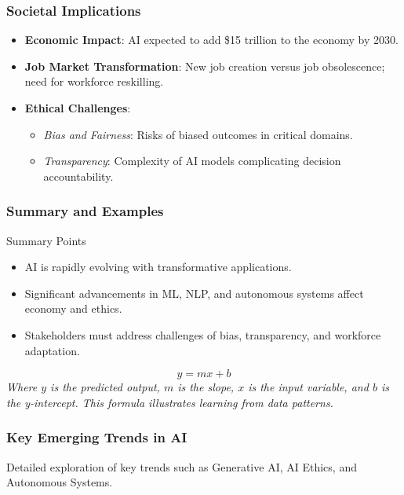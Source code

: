 \documentclass[aspectratio=169]{beamer}
\begin{document}
\begin{frame}[fragile]
    \frametitle{Societal Implications}
    \begin{itemize}
        \item \textbf{Economic Impact}: AI expected to add \$15 trillion to the economy by 2030.
        \item \textbf{Job Market Transformation}: New job creation versus job obsolescence; need for workforce reskilling.
        \item \textbf{Ethical Challenges}:
            \begin{itemize}
                \item \textit{Bias and Fairness}: Risks of biased outcomes in critical domains.
                \item \textit{Transparency}: Complexity of AI models complicating decision accountability.
            \end{itemize}
    \end{itemize}
\end{frame}

\begin{frame}[fragile]
    \frametitle{Summary and Examples}
    \begin{block}{Summary Points}
        \begin{itemize}
            \item AI is rapidly evolving with transformative applications.
            \item Significant advancements in ML, NLP, and autonomous systems affect economy and ethics.
            \item Stakeholders must address challenges of bias, transparency, and workforce adaptation.
        \end{itemize}
    \end{block}
    
    \begin{equation}
        y = mx + b
    \end{equation}
    \textit{Where \(y\) is the predicted output, \(m\) is the slope, \(x\) is the input variable, and \(b\) is the y-intercept. This formula illustrates learning from data patterns.}
\end{frame}

\begin{frame}[fragile]
    \frametitle{Key Emerging Trends in AI}
    Detailed exploration of key trends such as Generative AI, AI Ethics, and Autonomous Systems.
\end{frame}
\end{document}
